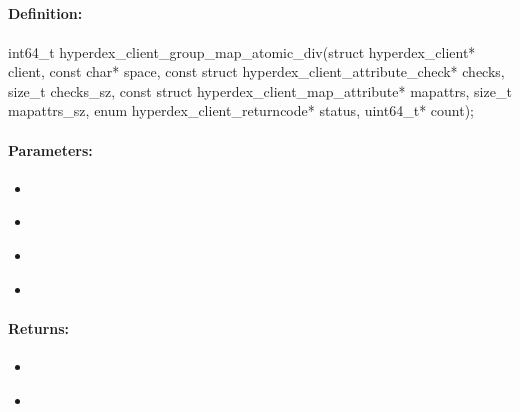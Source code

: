 \pagebreak
\subsection{}
\label{api:c:group_map_atomic_div}


\paragraph{Definition:}
\begin{ccode}
int64_t hyperdex_client_group_map_atomic_div(struct hyperdex_client* client,
        const char* space,
        const struct hyperdex_client_attribute_check* checks, size_t checks_sz,
        const struct hyperdex_client_map_attribute* mapattrs, size_t mapattrs_sz,
        enum hyperdex_client_returncode* status,
        uint64_t* count);
\end{ccode}

\paragraph{Parameters:}
\begin{itemize}[noitemsep]
\item {}\\

\item {}\\

\item {}\\

\item {}\\

\end{itemize}

\paragraph{Returns:}
\begin{itemize}[noitemsep]
\item {}\\

\item {}\\

\end{itemize}

